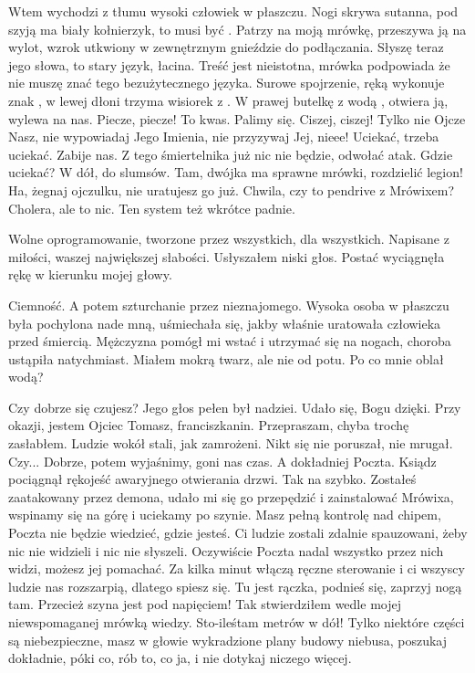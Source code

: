 Wtem wychodzi z tłumu wysoki człowiek w płaszczu.
Nogi skrywa sutanna, pod szyją ma biały kołnierzyk, to musi być \censor{}.
Patrzy na moją mrówkę, przeszywa ją na wylot, wzrok utkwiony w zewnętrznym gnieździe do podłączania.
Słyszę teraz jego słowa, to stary język, łacina. Treść jest nieistotna, mrówka podpowiada że nie muszę znać tego bezużytecznego języka.
Surowe spojrzenie, ręką wykonuje znak \censor{}, w lewej dłoni trzyma wisiorek z \censor{}.
W prawej butelkę z wodą \censor{}, otwiera ją, wylewa na nas.
Piecze, piecze! To kwas. Palimy się. 
Ciszej, ciszej! Tylko nie Ojcze Nasz, nie wypowiadaj Jego Imienia, nie przyzywaj Jej, nieee!
Uciekać, trzeba uciekać. Zabije nas. Z tego śmiertelnika już nic nie będzie, odwołać atak.
Gdzie uciekać? W dół, do slumsów. Tam, dwójka ma sprawne mrówki, rozdzielić legion!
Ha, żegnaj ojczulku, nie uratujesz go już. Chwila, czy to pendrive z Mrówixem? Cholera, ale to nic. Ten system też wkrótce padnie.

\begin{dialogue}
\ds{} Wolne oprogramowanie, tworzone przez wszystkich, dla wszystkich. Napisane z miłości, waszej największej słabości. \dm{} Usłyszałem niski głos. \dm{}
Postać wyciągnęła rękę w kierunku mojej głowy.
\end{dialogue}

Ciemność. A potem szturchanie przez nieznajomego.
Wysoka osoba w płaszczu była pochylona nade mną, uśmiechała się, jakby właśnie uratowała człowieka przed śmiercią.
Mężczyzna pomógł mi wstać i utrzymać się na nogach, choroba ustąpiła natychmiast.
Miałem mokrą twarz, ale nie od potu. Po co mnie oblał wodą?

\begin{dialogue}
\ds{} Czy dobrze się czujesz? \dm{} Jego głos pełen był nadziei. \dm{} Udało się, Bogu dzięki. Przy okazji, jestem Ojciec Tomasz, franciszkanin.
\ds{} Przepraszam, chyba trochę zasłabłem. \dm{} Ludzie wokół stali, jak zamrożeni. Nikt się nie poruszał, nie mrugał. \dm{}
Czy... 
\ds{} Dobrze, potem wyjaśnimy, goni nas czas. A dokładniej Poczta. \dm{} Ksiądz pociągnął rękojeść awaryjnego otwierania drzwi.
\dm{} Tak na szybko. Zostałeś zaatakowany przez demona, udało mi się go przepędzić i zainstalować Mrówixa, wspinamy się na górę i uciekamy po szynie.
Masz pełną kontrolę nad chipem, Poczta nie będzie wiedzieć, gdzie jesteś.
Ci ludzie zostali zdalnie spauzowani, żeby nic nie widzieli i nic nie słyszeli. Oczywiście Poczta nadal wszystko przez nich widzi, możesz jej pomachać.
Za kilka minut włączą ręczne sterowanie i ci wszyscy ludzie nas rozszarpią, dlatego spiesz się. Tu jest rączka, podnieś się, zaprzyj nogą tam.
\ds{} Przecież szyna jest pod napięciem! \dm{} Tak stwierdziłem wedle mojej niewspomaganej mrówką wiedzy. \dm{} Sto-ileśtam metrów w dół!
\ds{} Tylko niektóre części są niebezpieczne, masz w głowie wykradzione plany budowy niebusa, poszukaj dokładnie, póki co, rób to, co ja, i nie dotykaj niczego więcej.
\end{dialogue}

